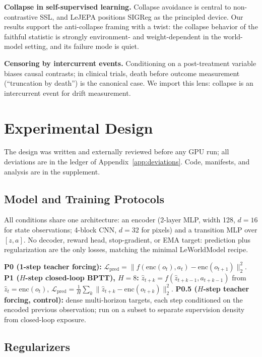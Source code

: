 \documentclass{article}
\begin{document}
\textbf{Collapse in self-supervised learning.} Collapse avoidance is central to non-contrastive SSL, and LeJEPA positions SIGReg as the principled device. Our results support the anti-collapse framing with a twist: the collapse behavior of the faithful statistic is strongly environment- and weight-dependent in the world-model setting, and its failure mode is quiet.

\textbf{Censoring by intercurrent events.} Conditioning on a post-treatment variable biases causal contrasts; in clinical trials, death before outcome measurement (``truncation by death'') is the canonical case. We import this lens: collapse is an intercurrent event for drift measurement.

\section{Experimental Design}
\label{sec:design}

The design was written and externally reviewed before any GPU run; all deviations are in the ledger of Appendix~\ref{app:deviations}. Code, manifests, and analysis are in the supplement.

\subsection{Model and Training Protocols}
\label{sec:protocols}

All conditions share one architecture: an encoder (2-layer MLP, width 128, $d{=}16$ for state observations; 4-block CNN, $d{=}32$ for pixels) and a transition MLP over $[z,a]$. No decoder, reward head, stop-gradient, or EMA target: prediction plus regularization are the only losses, matching the minimal LeWorldModel recipe.

\textbf{P0 (1-step teacher forcing):} $\mathcal{L}_{\text{pred}}=\lVert f(\mathrm{enc}(o_t),a_t)-\mathrm{enc}(o_{t+1})\rVert_2^2$.
\textbf{P1 ($H$-step closed-loop BPTT), $H{=}8$:} $\hat z_{t+k}=f(\hat z_{t+k-1},a_{t+k-1})$ from $\hat z_t=\mathrm{enc}(o_t)$, $\mathcal{L}_{\text{pred}}=\frac1H\sum_{k}\lVert \hat z_{t+k}-\mathrm{enc}(o_{t+k})\rVert_2^2$.
\textbf{P0.5 ($H$-step teacher forcing, control):} dense multi-horizon targets, each step conditioned on the encoded previous observation; run on a subset to separate supervision density from closed-loop exposure.

\subsection{Regularizers}
\label{sec:regularizers}
\end{document}
